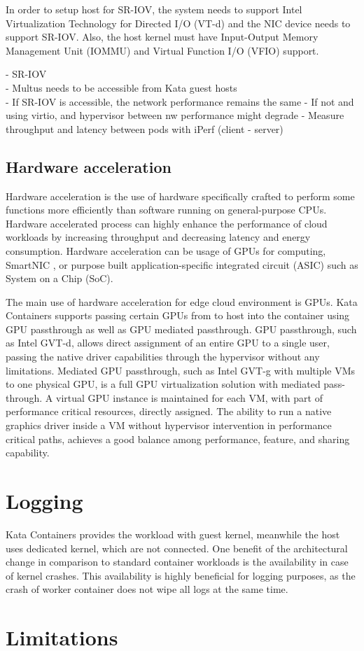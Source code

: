 In order to setup host for SR-IOV, the system needs to support Intel Virtualization Technology for Directed I/O (VT-d) and the NIC device needs to support SR-IOV. Also, the host kernel must have Input-Output Memory Management Unit (IOMMU) and Virtual Function I/O (VFIO) support.

- SR-IOV \\
	- Multus needs to be accessible from Kata guest hosts \\
	
- If SR-IOV is accessible, the network performance remains the same
	- If not and using virtio, and hypervisor between nw performance might degrade
		- Measure throughput and latency between pods with iPerf (client - server)

\subsection{Hardware acceleration}

Hardware acceleration is the use of hardware specifically crafted to perform some functions more efficiently than software running on general-purpose CPUs. Hardware accelerated process can highly enhance the performance of cloud workloads by increasing throughput and decreasing latency and energy consumption. Hardware acceleration can be usage of GPUs for computing, SmartNIC \cite{SmartNICIntel}, or purpose built application-specific integrated circuit (ASIC) such as System on a Chip (SoC).

The main use of hardware acceleration for edge cloud environment is GPUs. Kata Containers supports passing certain GPUs from to host into the container using GPU passthrough as well as GPU mediated passthrough. GPU passthrough, such as Intel GVT-d, allows direct assignment of an entire GPU to a single user, passing the native driver capabilities through the hypervisor without any limitations. Mediated GPU passthrough, such as Intel GVT-g with multiple VMs to one physical GPU, is a full GPU virtualization solution with mediated pass-through.
A virtual GPU instance is maintained for each VM, with part of performance critical resources, directly assigned. The ability to run a native graphics driver inside a VM without hypervisor intervention in performance critical paths, achieves a good balance among performance, feature, and sharing capability. \cite{GPUKataContainers}
		
\section{Logging}

Kata Containers provides the workload with guest kernel, meanwhile the host uses dedicated kernel, which are not connected. One benefit of the architectural change in comparison to standard container workloads is the availability in case of kernel crashes. This availability is highly beneficial for logging purposes, as the crash of worker container does not wipe all logs at the same time.

\section{Limitations}